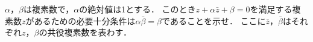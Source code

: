 \documentclass[../../main.tex]{subfiles}
\begin{document}
$\alpha$，$\beta$は複素数で，$\alpha$の絶対値は1とする．
このとき$z+\alpha\bar{z}+\beta=0$を満足する複素数$z$があるための必要十分条件は$\alpha\bar{\beta}=\beta$であることを示せ．
ここに$\bar{z}$，$\bar{\beta}$はそれぞれ$z$，$\beta$の共役複素数を表わす．
\end{document}
